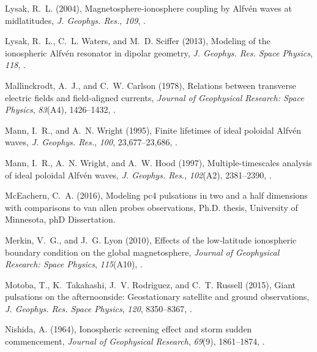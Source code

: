 \documentclass[draft,linenumbers]{agujournal}
\begin{document}
\begin{thebibliography}{62}
Lysak, R.~L. (2004), Magnetosphere-ionosphere coupling by {Alfv{\'e}n} waves at
  midlatitudes, \textit{J. Geophys. Res.}, \textit{109},
  .

Lysak, R.~L., C.~L. Waters, and M.~D. Sciffer (2013), Modeling of the
  ionospheric {Alfv{\'e}n} resonator in dipolar geometry, \textit{J. Geophys.
  Res. Space Physics}, \textit{118}, .

Mallinckrodt, A.~J., and C.~W. Carlson (1978), Relations between transverse
  electric fields and field‐aligned currents, \textit{Journal of Geophysical
  Research: Space Physics}, \textit{83}(A4), 1426--1432,
  .

Mann, I.~R., and A.~N. Wright (1995), Finite lifetimes of ideal poloidal
  {Alfv{\'e}n} waves, \textit{J. Geophys. Res.}, \textit{100}, 23,677--23,686,
  .

Mann, I.~R., A.~N. Wright, and A.~W. Hood (1997), Multiple-timescales analysis
  of ideal poloidal {Alfv{\'e}n} waves, \textit{J. Geophys. Res.},
  \textit{102}(A2), 2381--2390, .

McEachern, C.~A. (2016), Modeling pc4 pulsations in two and a half dimensions
  with comparisons to van allen probes observations, Ph.D. thesis, University
  of Minnesota, phD Dissertation.

Merkin, V.~G., and J.~G. Lyon (2010), Effects of the low‐latitude ionospheric
  boundary condition on the global magnetosphere, \textit{Journal of
  Geophysical Research: Space Physics}, \textit{115}(A10),
  .

Motoba, T., K.~Takahashi, J.~V. Rodriguez, and C.~T. Russell (2015), Giant
  pulsations on the afternoonside: Geostationary satellite and ground
  observations, \textit{J. Geophys. Res. Space Physics}, \textit{120},
  8350--8367, .

Nishida, A. (1964), Ionospheric screening effect and storm sudden commencement,
  \textit{Journal of Geophysical Research}, \textit{69}(9), 1861--1874,
  .


\end{thebibliography}
\end{document}
